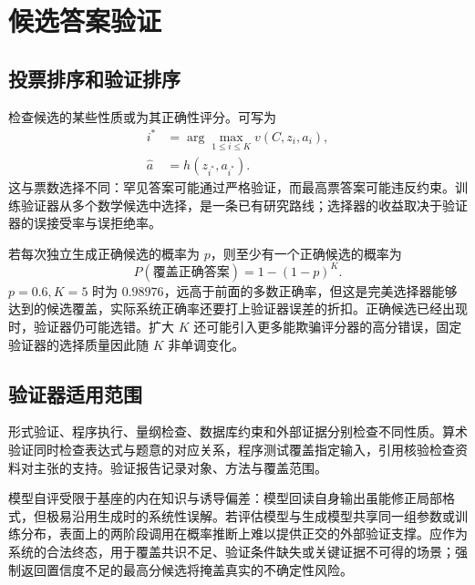 \documentclass[../textbook.tex]{subfiles}
\begin{document}
\section{候选答案验证}

\subsection{投票排序和验证排序}
检查候选的某些性质或为其正确性评分。可写为
\begin{equation}
 \begin{aligned}
  i^* &= \arg\max_{1\le i\le K}v(C,z_i,a_i), \\
  \widehat a &= h(z_{i^*},a_{i^*}).
 \end{aligned}
\end{equation}
这与票数选择不同：罕见答案可能通过严格验证，而最高票答案可能违反约束。训练验证器从多个数学候选中选择，是一条已有研究路线\cite{cobbe2021verifiers}；选择器的收益取决于验证器的误接受率与误拒绝率。

若每次独立生成正确候选的概率为 $p$，则至少有一个正确候选的概率为
\begin{equation}
P(\text{覆盖正确答案})=1-(1-p)^K.
\label{eq:icl-coverage}
\end{equation}
$p=0.6,K=5$ 时为 $0.98976$，远高于前面的多数正确率，但这是完美选择器能够达到的候选覆盖，实际系统正确率还要打上验证器误差的折扣。正确候选已经出现时，验证器仍可能选错。扩大 $K$ 还可能引入更多能欺骗评分器的高分错误，固定验证器的选择质量因此随 $K$ 非单调变化。

\subsection{验证器适用范围}
形式验证、程序执行、量纲检查、数据库约束和外部证据分别检查不同性质。算术验证同时检查表达式与题意的对应关系，程序测试覆盖指定输入，引用核验检查资料对主张的支持。验证报告记录对象、方法与覆盖范围。

模型自评受限于基座的内在知识与诱导偏差：模型回读自身输出虽能修正局部格式，但极易沿用生成时的系统性误解。若评估模型与生成模型共享同一组参数或训练分布，表面上的两阶段调用在概率推断上难以提供正交的外部验证支撑。应作为系统的合法终态，用于覆盖共识不足、验证条件缺失或关键证据不可得的场景；强制返回置信度不足的最高分候选将掩盖真实的不确定性风险。
\end{document}
